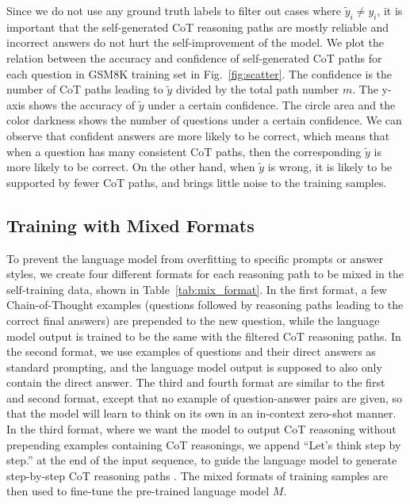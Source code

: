 \documentclass{article} %
\begin{document}
Since we do not use any ground truth labels to filter out cases where $\tilde{y}_i\neq y_i$, it is important that the self-generated CoT reasoning paths are mostly reliable and incorrect answers do not hurt the self-improvement of the model.
We plot the relation between the accuracy and confidence of self-generated CoT paths for each question in GSM8K training set in Fig.~\ref{fig:scatter}. 
The confidence is the number of CoT paths leading to $\tilde{y}$ divided by the total path number $m$. The y-axis shows the accuracy of $\tilde{y}$ under a certain confidence. The circle area and the color darkness shows the number of questions under a certain confidence. 
We can observe that confident answers are more likely to be correct, which means that when a question has many consistent CoT paths, then the corresponding $\tilde{y}$ is more likely to be correct. On the other hand, when $\tilde{y}$ is wrong, it is likely to be supported by fewer CoT paths, and brings little noise to the training samples.


\subsection{Training with Mixed Formats}\label{sec:mix_formats}
To prevent the language model from overfitting to specific prompts or answer styles, we create four different formats for each reasoning path to be mixed in the self-training data, shown in Table~\ref{tab:mix_format}. In the first format, a few Chain-of-Thought examples (questions followed by reasoning paths leading to the correct final answers) are prepended to the new question, while the language model output is trained to be the same with the filtered CoT reasoning paths. In the second format, we use examples of questions and their direct answers as standard prompting, and the language model output is supposed to also only contain the direct answer. The third and fourth format are similar to the first and second format, except that no example of question-answer pairs are given, so that the model will learn to think on its own in an in-context zero-shot manner. In the third format, where we want the model to output CoT reasoning without prepending examples containing CoT reasonings, we append ``Let's think step by step.'' at the end of the input sequence, to guide the language model to generate step-by-step CoT reasoning paths \citep{step_by_step}. The mixed formats of training samples are then used to fine-tune the pre-trained language model $M$.
\end{document}
